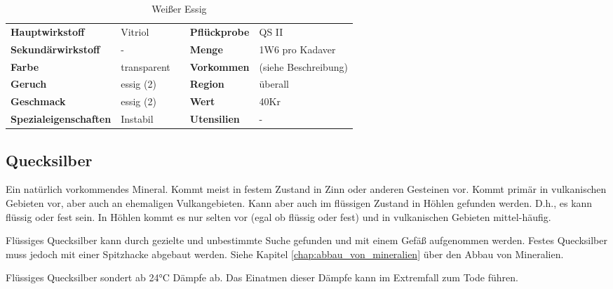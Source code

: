 \begin{table}[H] 
\begin{center} 
\begin{tabular}{|l|l|p{1cm}|l|l|} 
  	\cline{1-2} \cline{4-5} 
  	\textbf{Hauptwirkstoff} & Vitriol && \textbf{Pflückprobe} & QS II \\ \cline{1-2} \cline{4-5} 
  	\textbf{Sekundärwirkstoff} & - && \textbf{Menge} & 1W6 pro Kadaver \\ \cline{1-2} \cline{4-5} 
  	\textbf{Farbe} & transparent && \textbf{Vorkommen} & (siehe Beschreibung) \\ \cline{1-2} \cline{4-5} 
  	\textbf{Geruch} & essig (2) && \textbf{Region} & überall \\ \cline{1-2} \cline{4-5} 
  	\textbf{Geschmack} & essig (2) && \textbf{Wert} & 40Kr \\ \cline{1-2} \cline{4-5} 
  	\textbf{Spezialeigenschaften} & Instabil && \textbf{Utensilien} & - \\ \cline{1-2} \cline{4-5} 
\end{tabular} 
\end{center} 
\caption{Weißer Essig} 
\label{tab:weisser_essig} 
\end{table}


\subsection{Quecksilber}
Ein natürlich vorkommendes Mineral. Kommt meist in festem Zustand in Zinn oder anderen Gesteinen vor. Kommt primär in vulkanischen Gebieten vor, aber auch an ehemaligen Vulkangebieten. Kann aber auch im flüssigen Zustand in Höhlen gefunden werden. D.h., es kann flüssig oder fest sein. In Höhlen kommt es nur selten vor (egal ob flüssig oder fest) und in vulkanischen Gebieten mittel-häufig.

Flüssiges Quecksilber kann durch gezielte und unbestimmte Suche gefunden und mit einem Gefäß aufgenommen werden. Festes Quecksilber muss jedoch mit einer Spitzhacke abgebaut werden. Siehe Kapitel \ref{chap:abbau_von_mineralien} über den Abbau von Mineralien.

Flüssiges Quecksilber sondert ab 24°C Dämpfe ab. Das Einatmen dieser Dämpfe kann im Extremfall zum Tode führen.


